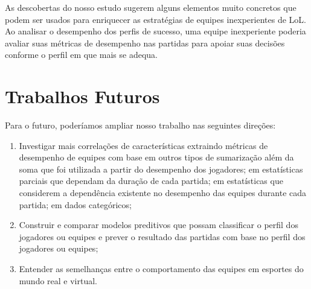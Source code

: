 As descobertas do nosso estudo sugerem alguns elementos muito concretos que podem ser usados para enriquecer as estratégias de equipes inexperientes de LoL. Ao analisar o desempenho dos perfis de sucesso, uma equipe inexperiente poderia avaliar suas métricas de desempenho nas partidas para apoiar suas decisões conforme o perfil em que mais se adequa.


\section{Trabalhos Futuros}
Para o futuro, poderíamos ampliar nosso trabalho nas seguintes direções:

\begin{enumerate}[label=(\roman*)]
  \item
  	Investigar mais correlações de características extraindo métricas de desempenho de equipes com base em outros tipos de sumarização além da soma que foi utilizada a partir do desempenho dos jogadores; em estatísticas parciais que dependam da duração de cada partida; em estatísticas que considerem a dependência existente no desempenho das equipes durante cada partida; em dados categóricos;
  \item
  	 Construir e comparar modelos preditivos que possam classificar o perfil dos jogadores ou equipes e prever o resultado das partidas com base no perfil dos jogadores ou equipes;
  \item
  	Entender as semelhanças entre o comportamento das equipes em esportes do mundo real e virtual.
\end{enumerate}

